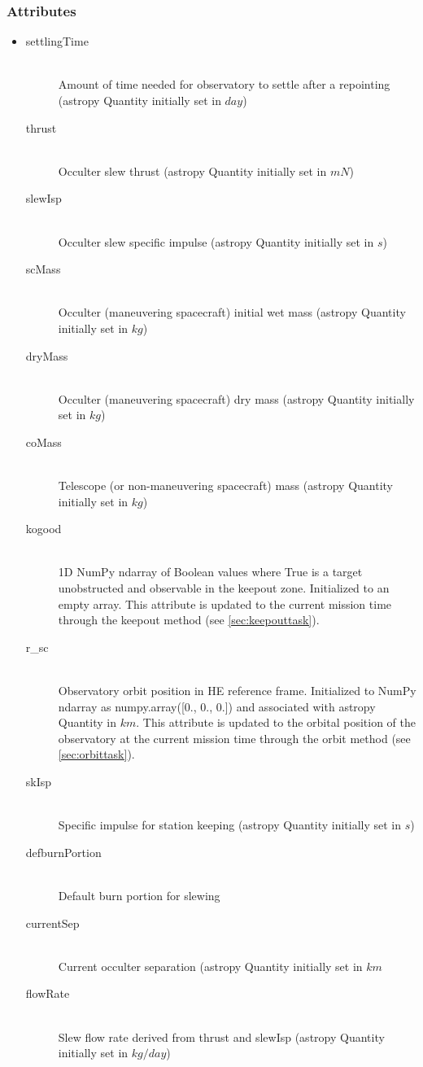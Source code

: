\documentclass[cleanfoot]{asme2ej}
\begin{document}
\subsubsection*{Attributes}
\begin{itemize}
    \item
    \begin{description}
        \item[settlingTime] \hfill \\
        Amount of time needed for observatory to settle after a repointing (astropy Quantity initially set in $ day $)
        \item[thrust] \hfill \\
        Occulter slew thrust (astropy Quantity initially set in $ mN $)
        \item[slewIsp] \hfill \\
        Occulter slew specific impulse (astropy Quantity initially set in $ s $)
        \item[scMass] \hfill \\
        Occulter (maneuvering spacecraft) initial wet mass (astropy Quantity initially set in $ kg $)
        \item[dryMass] \hfill \\
        Occulter (maneuvering spacecraft) dry mass (astropy Quantity initially set in $ kg $)
        \item[coMass] \hfill \\
        Telescope (or non-maneuvering spacecraft) mass (astropy Quantity initially set in $ kg $)
        \item[kogood] \hfill \\
        1D NumPy ndarray of Boolean values where True is a target unobstructed and observable in the keepout zone. Initialized to an empty array. This attribute is updated to the current mission time through the keepout method (see \ref{sec:keepouttask}).
        \item[r\_sc] \hfill \\
        Observatory orbit position in HE reference frame. Initialized to NumPy ndarray as numpy.array([0., 0., 0.]) and associated with astropy Quantity in $ km $. This attribute is updated to the orbital position of the observatory at the current mission time through the orbit method (see \ref{sec:orbittask}).
        \item[skIsp] \hfill \\
        Specific impulse for station keeping (astropy Quantity initially set in $ s $)
        \item[defburnPortion] \hfill \\
        Default burn portion for slewing
        \item[currentSep] \hfill \\
        Current occulter separation (astropy Quantity initially set in $ km $
        \item[flowRate] \hfill \\
        Slew flow rate derived from thrust and slewIsp (astropy Quantity initially set in $ kg/day $)
        
    \end{description}
\end{itemize}
\end{document}
